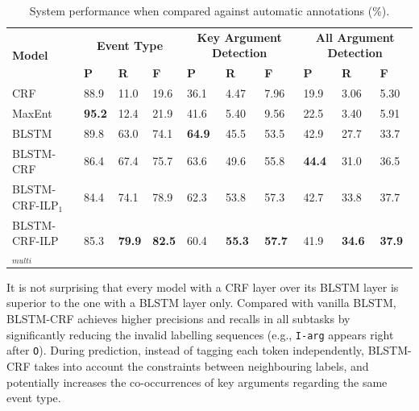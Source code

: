 \begin{table}[!t]
\centering
\scriptsize
\begin{tabular}{|l|p{}<{\centering}|p{}<{\centering}|p{}<{\centering}|p{}<{\centering}|p{}<{\centering}|p{}<{\centering}|p{}<{\centering}|p{}<{\centering}|p{}<{\centering}|} \hline
	\multirow{2}{*}{\textbf{Model}} & \multicolumn{3}{c|}{\textbf{Event Type}} & \multicolumn{3}{c|}{\textbf{Key Argument Detection}} &
	\multicolumn{3}{c|}{\textbf{All Argument Detection}} \\ \cline{2-10}
	 & \textbf{P} & \textbf{R} & \textbf{F} & \textbf{P} & \textbf{R} & \textbf{F} & \textbf{P} & \textbf{R} & \textbf{F }\\ \hline
	\rowcolor{Gray} CRF & 88.9 & 11.0 & 19.6 & 36.1 & 4.47 & 7.96 & 19.9 & 3.06 & 5.30  \\ \hline
	MaxEnt & \textbf{95.2} & 12.4 & 21.9 & 41.6 & 5.40 & 9.56 & 22.5 & 3.40 & 5.91 \\ \hline
	\rowcolor{Gray} BLSTM & 89.8 & 63.0 & 74.1 & \textbf{64.9} & 45.5 & 53.5 & 42.9 & 27.7 & 33.7  \\ \hline \hline
	BLSTM-CRF & 86.4 & 67.4 & 75.7 & 63.6 & 49.6 & 55.8 & \textbf{44.4} & 31.0 & 36.5  \\ \hline
	\rowcolor{Gray} BLSTM-CRF-ILP$_{1}$ & 84.4 & 74.1 & 78.9 & 62.3 & 53.8 & 57.3 & 42.7 & 33.8 & 37.7 \\ \hline
	BLSTM-CRF-ILP$_{multi}$ & 85.3 & \textbf{79.9} & \textbf{82.5} & 60.4 & \textbf{55.3} & \textbf{57.7} & 41.9 & \textbf{34.6} & \textbf{37.9} \\ \hline
\end{tabular}
\vspace{-2mm}
\caption{System performance when compared against automatic annotations (\%).  \label{tab:1}}
\vspace{-3mm}
\end{table}


It is not surprising that  every model with a CRF layer over its BLSTM layer is superior to the one with a BLSTM layer only. Compared with vanilla BLSTM, BLSTM-CRF achieves higher precisions and recalls in all subtasks by significantly reducing the invalid labelling sequences (e.g., \texttt{I-arg} appears right after \texttt{O}). During prediction, instead of tagging each token independently, BLSTM-CRF takes into account the constraints between neighbouring labels, and potentially increases the co-occurrences of key arguments regarding the same event type. %

